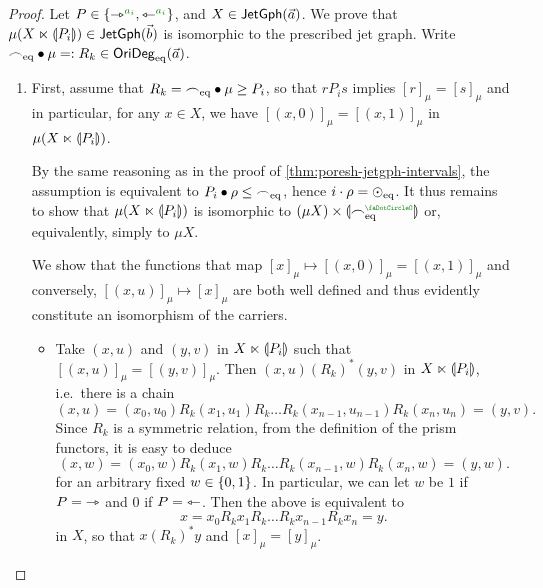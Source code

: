 \documentclass[a4paper]{memoir}
\begin{document}
\begin{proof}
	Let $P \in \accol{\jetsym\pmr{a_i}, \tejsym\pmr{a_i}}$, and $X \in \mathsf{JetGph}(\vec a)$.
	We prove that $\mu(X \ltimes {\llparenthesis P_i \rrparenthesis}) \in \mathsf{JetGph}(\vec b)$ is isomorphic to the prescribed jet graph.
	Write ${\frown}_{{\mathrm{eq}}} \mathbin{\bullet} \mu =: R_k \in \mathsf{OriDeg}_{\mathrm{eq}}(\vec a)$.
	\begin{enumerate}
		\item First, assume that $R_k = {\frown}_{\mathrm{eq}} \mathbin{\bullet} \mu \geq P_i$, so that $r \mathrel{P_i} s$ implies $[r]_\mu = [s]_\mu$ and in particular, for any $x \in X$, we have $[(x, 0)]_\mu = [(x, 1)]_\mu$ in $\mu(X \ltimes {\llparenthesis P_i \rrparenthesis})$.
		
		By the same reasoning as in the proof of \cref{thm:poresh-jetgph-intervals}, the assumption is equivalent to $P_i \mathbin{\bullet} \rho \leq {\frown}_{\mathrm{eq}}$, hence $i \cdot \rho = {\odot}_{\mathrm{eq}}$.
		It thus remains to show that $\mu(X \ltimes {\llparenthesis P_i \rrparenthesis})$ is isomorphic to $(\mu X) \times \rival{\eqtysym\pmrn}$ or, equivalently, simply to $\mu X$.
		
		We show that the functions that map $[x]_\mu \mapsto [(x, 0)]_\mu = [(x, 1)]_\mu$ and conversely, $[(x, u)]_\mu \mapsto [x]_\mu$ are both well defined and thus evidently constitute an isomorphism of the carriers.
		\begin{itemize}
			\item[\framebox{$\to$}]
			Take $(x, u)$ and $(y, v)$ in $X \ltimes {\llparenthesis P_i \rrparenthesis}$ such that $[(x, u)]_\mu = [(y, v)]_\mu$.
			Then $(x, u) \mathrel{(R_k)^*} (y, v)$ in $X \ltimes {\llparenthesis P_i \rrparenthesis}$, i.e.\ there is a chain
			\[
				(x, u) = (x_0, u_0) \mathrel{R_k} (x_1, u_1) \mathrel{R_k} \ldots \mathrel{R_k} (x_{n-1}, u_{n-1}) \mathrel{R_k} (x_n, u_n) = (y, v).
			\]
			Since $R_k$ is a symmetric relation, from the definition of the prism functors, it is easy to deduce
			\[
				(x, w) = (x_0, w) \mathrel{R_k} (x_1, w) \mathrel{R_k} \ldots \mathrel{R_k} (x_{n-1}, w) \mathrel{R_k} (x_n, w) = (y, w).
			\]
			for an arbitrary fixed $w \in \mathopen{}\left\{ 0, 1 \right\}\mathclose{}$.
			In particular, we can let $w$ be $1$ if $P = {\rightarrowtriangle}$ and $0$ if $P = {\leftarrowtriangle}$.
			Then the above is equivalent to
			\[
				x = x_0 \mathrel{R_k} x_1 \mathrel{R_k} \ldots \mathrel{R_k} x_{n-1} \mathrel{R_k} x_n = y.
			\]
			in $X$, so that $x \mathrel{(R_k)^*} y$ and $[x]_\mu = [y]_\mu$.
			

\end{itemize}
\end{enumerate}
\end{proof}
\end{document}
